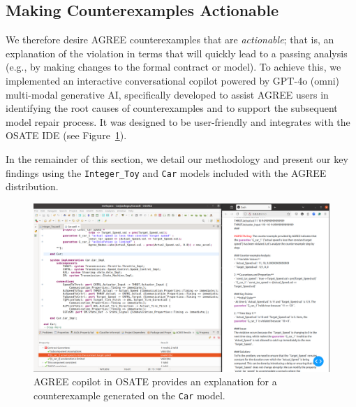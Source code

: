 \subsection{Making Counterexamples Actionable} 
We therefore desire AGREE counterexamples that are \textit{actionable}; that is, an explanation of the violation in terms that will quickly lead to a passing analysis (e.g., by making changes to the formal contract or model).
%
To achieve this, we implemented
an interactive conversational copilot powered by GPT-4o (omni) multi-modal generative AI, specifically developed to assist AGREE users in identifying the root causes of counterexamples and to support the subsequent model repair process. It was designed to be user-friendly and integrates with the OSATE IDE (see Figure~\ref{fig:AGREEDOG}). 

In the remainder of this section, we detail our methodology and present our key findings using the \texttt{Integer\_Toy} and \texttt{Car} models included with the AGREE distribution.

\begin{figure}[htbp]  
    \centering
    \includegraphics[width=\textwidth]{AGREE-DOG-high-rs.png}%
    \caption{AGREE copilot in OSATE provides an explanation for a counterexample generated on the \texttt{Car} model.}
    \label{fig:AGREEDOG}
\end{figure}


